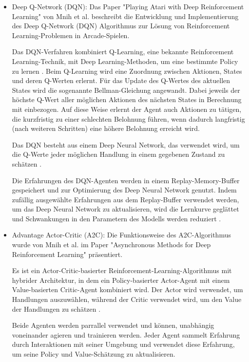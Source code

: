\documentclass[oneside,bibliography=totocnumbered,BCOR=5mm]{scrbook}%
\theoremstyle{definition}
\theoremstyle{definition}
\theoremstyle{definition}
\theoremstyle{definition}
\theoremstyle{definition}
\theoremstyle{definition}
\begin{document}
\begin{itemize}
  \item Deep Q-Network (DQN): Das Paper "Playing Atari with Deep Reinforcement Learning" von 
  Mnih et al. beschreibt die Entwicklung und Implementierung des Deep Q-Network (DQN) 
  Algorithmus zur Lösung von Reinforcement Learning-Problemen in Arcade-Spielen.

  Das DQN-Verfahren kombiniert Q-Learning, eine bekannte Reinforcement Learning-Technik, 
  mit Deep Learning-Methoden, um eine bestimmte Policy zu lernen \autocite[Seite 4]{DQN}.
  Beim Q-Learning wird eine Zuordnung zwischen Aktionen, States und deren Q-Werten erlernt.
  Für das Update des Q-Wertes des aktuellen States wird die sogenannte Bellman-Gleichung angewandt.
  Dabei jeweils der höchste Q-Wert aller möglichen Aktionen des nächsten States in Berechnung mit einbezogen. 
  Auf diese Weise erlernt der Agent auch Aktionen zu tätigen, die kurzfristig zu einer schlechten
  Belohnung führen, wenn dadurch langfristig (nach weiteren Schritten) eine höhere Belohnung erreicht wird.

  Das DQN besteht aus einem Deep Neural Network, das verwendet wird, 
  um die Q-Werte jeder möglichen Handlung in einem gegebenen Zustand zu schätzen \autocite[Seite 5]{DQN}. 
 
  Die Erfahrungen des DQN-Agenten werden in einem Replay-Memory-Buffer gespeichert und 
  zur Optimierung des Deep Neural Network genutzt. 
  Indem zufällig ausgewählte Erfahrungen aus dem Replay-Buffer verwendet werden, um das Deep Neural Network zu aktualisieren,
  wird die Lernkurve geglättet und Schwankungen in den Parametern des Modells werden reduziert \autocite[Seite 5]{DQN}.
  

  \item Advantage Actor-Critic (A2C): Die Funktionsweise des A2C-Algorithmus wurde von Mnih et al. im Paper 
  "Asynchronous Methods for Deep Reinforcement Learning" präsentiert. 

  Es ist ein Actor-Critic-basierter Reinforcement-Learning-Algorithmus 
  mit hybrider Architektur, in dem ein Policy-basierter Actor-Agent mit 
  einem Value-basierten Critic-Agent kombiniert wird. 
  Der Actor wird verwendet, um Handlungen auszuwählen, 
  während der Critic verwendet wird, um den Value der Handlungen zu schätzen \autocite[Seite 3]{A2C}.

  Beide Agenten werden parrallel verwendet und können, 
  unabhängig voneinander agieren und trainieren werden. 
  Jeder Agent sammelt Erfahrung durch Interaktionen mit seiner Umgebung und verwendet 
  diese Erfahrung, um seine Policy und Value-Schätzung zu aktualisieren. 
  

\end{itemize}
\end{document}
